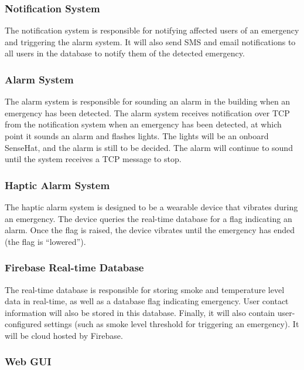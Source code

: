 \subsubsection{Notification System}

The notification system is responsible for notifying affected users of an emergency and triggering the alarm system. It
will also send SMS and email notifications to all users in the database to notify them of the detected emergency.

\subsubsection{Alarm System}

The alarm system is responsible for sounding an alarm in the building when an emergency has been detected. The alarm
system receives notification over TCP from the notification system when an emergency has been detected, at which point
it sounds an alarm and flashes lights. The lights will be an onboard SenseHat, and the alarm is still to be decided.
The alarm will continue to sound until the system receives a TCP message to stop.

\subsubsection{Haptic Alarm System} %

The haptic alarm system is designed to be a wearable device that vibrates during an emergency. The device queries the
real-time database for a flag indicating an alarm. Once the flag is raised, the device vibrates until the emergency has
ended (the flag is “lowered”).

\subsubsection{Firebase Real-time Database} %

The real-time database is responsible for storing smoke and temperature level data in real-time, as well as a database
flag indicating emergency. User contact information will also be stored in this database. Finally, it will also contain
user-configured settings (such as smoke level threshold for triggering an emergency). It will be cloud hosted by
Firebase.

\subsubsection{Web GUI}

